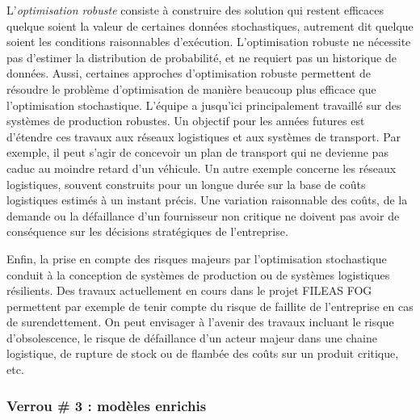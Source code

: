 	
	L'\textit{optimisation robuste} consiste à construire des solution qui restent efficaces  quelque soient la valeur de certaines données stochastiques, autrement dit quelque soient les conditions raisonnables d'exécution.
    L'optimisation robuste ne nécessite pas d'estimer la distribution de probabilité, et ne requiert pas un historique de données. Aussi, certaines approches d'optimisation robuste permettent de résoudre le problème d'optimisation de manière beaucoup plus efficace que l'optimisation stochastique. L'équipe a jusqu'ici principalement travaillé sur des systèmes de production robustes. Un objectif pour les années futures est d'étendre ces travaux aux réseaux logistiques et aux systèmes de transport. Par exemple, il peut s'agir de concevoir un plan de transport qui ne devienne pas caduc au moindre retard d'un véhicule. Un autre exemple concerne les réseaux logistiques, souvent construits pour un longue durée sur la base de coûts logistiques estimés à un instant précis. Une variation raisonnable des coûts, de la demande ou la défaillance d'un fournisseur non critique
	ne doivent pas avoir de conséquence sur les décisions stratégiques de l'entreprise. 
	
	Enfin, la prise en compte des risques majeurs par l'optimisation stochastique 
	conduit à la conception de systèmes de production ou de systèmes logistiques résilients. Des travaux actuellement en cours dans le projet FILEAS FOG permettent par exemple de tenir compte du risque de faillite de l'entreprise en cas de surendettement. On peut envisager à l'avenir des travaux incluant le risque d'obsolescence, le risque de défaillance d'un acteur majeur dans une chaine logistique, de rupture de stock ou de flambée des coûts sur un produit critique, etc. 
	
	
	
	
	\subsubsection*{Verrou \# 3 : modèles enrichis}
	
